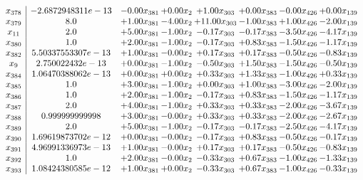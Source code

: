 \documentclass[8pt]{article}
\begin{document}
\[\begin{array}{c| c c@{\hskip 2pt} c@{\hskip 2pt} c@{\hskip 2pt} c@{\hskip 2pt} c@{\hskip 2pt} c@{\hskip 2pt} }
 x_{378}   &  -2.6872948311e-13 & -0.00 x_{381} & +  0.00 x_{2} & +  1.00 x_{303} & +  0.00 x_{383} & -0.00 x_{426} & +  0.00 x_{139}\\
 x_{379}   &  8.0 & +  1.00 x_{381} & -4.00 x_{2} & + 11.00 x_{303} & -1.00 x_{383} & +  1.00 x_{426} & -2.00 x_{139}\\
 x_{11}   &  2.0 & +  5.00 x_{381} & -1.00 x_{2} & -0.17 x_{303} & -0.17 x_{383} & -3.50 x_{426} & -4.17 x_{139}\\
 x_{380}   &  1.0 & +  2.00 x_{381} & -1.00 x_{2} & -0.17 x_{303} & +  0.83 x_{383} & -1.50 x_{426} & -1.17 x_{139}\\
 x_{382}   &  5.50337553307e-13 & +  1.00 x_{381} & -0.00 x_{2} & +  0.17 x_{303} & +  0.17 x_{383} & -0.50 x_{426} & -0.83 x_{139}\\
 x_{9}   &  2.750022432e-13 & +  0.00 x_{381} & -1.00 x_{2} & -0.50 x_{303} & +  1.50 x_{383} & -1.50 x_{426} & -0.50 x_{139}\\
 x_{384}   &  1.06470388062e-13 & +  0.00 x_{381} & +  0.00 x_{2} & +  0.33 x_{303} & +  1.33 x_{383} & -1.00 x_{426} & +  0.33 x_{139}\\
 x_{385}   &  1.0 & +  3.00 x_{381} & -1.00 x_{2} & +  0.00 x_{303} & +  1.00 x_{383} & -3.00 x_{426} & -2.00 x_{139}\\
 x_{386}   &  1.0 & +  2.00 x_{381} & -1.00 x_{2} & -0.17 x_{303} & +  0.83 x_{383} & -1.50 x_{426} & -1.17 x_{139}\\
 x_{387}   &  2.0 & +  4.00 x_{381} & -1.00 x_{2} & +  0.33 x_{303} & +  0.33 x_{383} & -2.00 x_{426} & -3.67 x_{139}\\
 x_{388}   &  0.999999999998 & +  3.00 x_{381} & -0.00 x_{2} & +  0.33 x_{303} & +  0.33 x_{383} & -2.00 x_{426} & -2.67 x_{139}\\
 x_{389}   &  2.0 & +  5.00 x_{381} & -1.00 x_{2} & -0.17 x_{303} & -0.17 x_{383} & -2.50 x_{426} & -4.17 x_{139}\\
 x_{390}   &  1.69619873702e-12 & +  0.00 x_{381} & -0.00 x_{2} & -0.17 x_{303} & +  0.83 x_{383} & -0.50 x_{426} & -0.17 x_{139}\\
 x_{391}   &  4.96991336973e-13 & +  1.00 x_{381} & -0.00 x_{2} & +  0.17 x_{303} & +  0.17 x_{383} & -0.50 x_{426} & -0.83 x_{139}\\
 x_{392}   &  1.0 & +  2.00 x_{381} & -0.00 x_{2} & -0.33 x_{303} & +  0.67 x_{383} & -1.00 x_{426} & -1.33 x_{139}\\
 x_{393}   &  1.08424380585e-12 & +  1.00 x_{381} & +  0.00 x_{2} & -0.33 x_{303} & +  0.67 x_{383} & -1.00 x_{426} & -0.33 x_{139}\\

\end{array}\]
\end{document}
